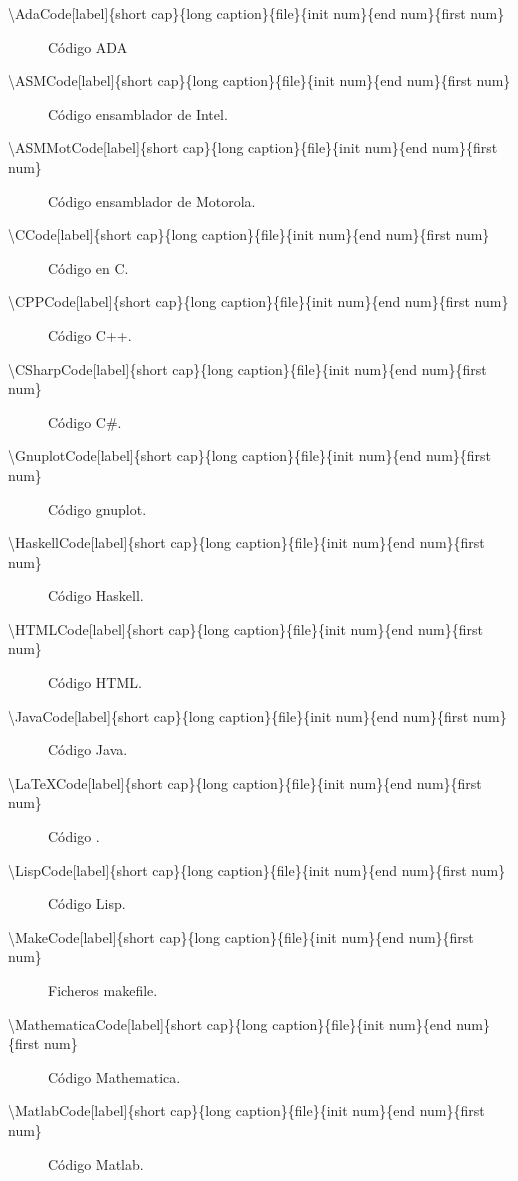 \begin{description}
\item [\textbackslash AdaCode{[label]}\{short cap\}\{long caption\}\{file\}\{init num\}\{end num\}\{first num\}] Código ADA
\item [\textbackslash ASMCode{[label]}\{short cap\}\{long caption\}\{file\}\{init num\}\{end num\}\{first num\}] Código ensamblador de Intel.
\item [\textbackslash ASMMotCode{[label]}\{short cap\}\{long caption\}\{file\}\{init num\}\{end num\}\{first num\}] Código ensamblador de Motorola.
\item [\textbackslash CCode{[label]}\{short cap\}\{long caption\}\{file\}\{init num\}\{end num\}\{first num\}] Código en C.
\item [\textbackslash CPPCode{[label]}\{short cap\}\{long caption\}\{file\}\{init num\}\{end num\}\{first num\}] Código C++.
\item [\textbackslash CSharpCode{[label]}\{short cap\}\{long caption\}\{file\}\{init num\}\{end num\}\{first num\}] Código C\#.
\item [\textbackslash GnuplotCode{[label]}\{short cap\}\{long caption\}\{file\}\{init num\}\{end num\}\{first num\}] Código gnuplot.
\item [\textbackslash HaskellCode{[label]}\{short cap\}\{long caption\}\{file\}\{init num\}\{end num\}\{first num\}] Código Haskell.
\item [\textbackslash HTMLCode{[label]}\{short cap\}\{long caption\}\{file\}\{init num\}\{end num\}\{first num\}] Código HTML.
\item [\textbackslash JavaCode{[label]}\{short cap\}\{long caption\}\{file\}\{init num\}\{end num\}\{first num\}] Código Java.
\item [\textbackslash LaTeXCode{[label]}\{short cap\}\{long caption\}\{file\}\{init num\}\{end num\}\{first num\}] Código \LaTeXe.
\item [\textbackslash LispCode{[label]}\{short cap\}\{long caption\}\{file\}\{init num\}\{end num\}\{first num\}] Código Lisp.
\item [\textbackslash MakeCode{[label]}\{short cap\}\{long caption\}\{file\}\{init num\}\{end num\}\{first num\}] Ficheros makefile.
\item [\textbackslash MathematicaCode{[label]}\{short cap\}\{long caption\}\{file\}\{init num\}\{end num\}\{first num\}] Código Mathematica.
\item [\textbackslash MatlabCode{[label]}\{short cap\}\{long caption\}\{file\}\{init num\}\{end num\}\{first num\}] Código Matlab.

\end{description}
